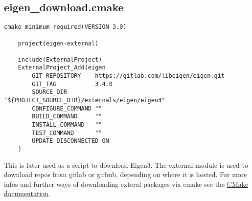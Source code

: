 \subsection{eigen\_download.cmake} \label{ss:auto_installation/eigen_download.cmake}
\begin{lstlisting}[style=CmakeStyle]
    cmake_minimum_required(VERSION 3.0)

    project(eigen-external)

    include(ExternalProject)
    ExternalProject_Add(eigen
        GIT_REPOSITORY    https://gitlab.com/libeigen/eigen.git
        GIT_TAG           3.4.0
        SOURCE_DIR        "${PROJECT_SOURCE_DIR}/externals/eigen/eigen3"
        CONFIGURE_COMMAND ""
        BUILD_COMMAND     ""
        INSTALL_COMMAND   ""
        TEST_COMMAND      ""
        UPDATE_DISCONNECTED ON
    )
\end{lstlisting}
This is later used as a script to download Eigen3. The external  module is used to download repos from gitlab or girhub, depending on where it is hosted. For more infos and further ways of downloading exteral packages via cmake see the \href{https://cmake.org/cmake/help/v3.0/module/ExternalProject.html}{CMake documentation}.
